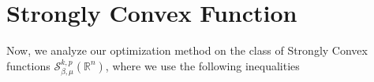 \section{Strongly Convex Function}
Now, we analyze our optimization method on the class of Strongly Convex functions $\mathcal{S}_{\beta,\mu}^{k,p}(\mathbb{R}^n)$, where we use the following inequalities
